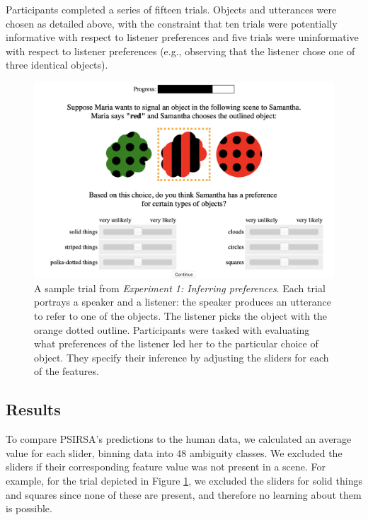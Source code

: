 \documentclass[10pt,a4paper]{article}
\newcommand{\gcs}[1]{\textcolor{blue}{[gcs: #1]}}
\begin{document}
Participants completed a series of fifteen trials. Objects and utterances were chosen as detailed above, with the constraint that ten trials were potentially informative with respect to listener preferences and five trials were uninformative with respect to listener preferences (e.g., observing that the listener chose one of three identical objects). 

\begin{figure}[ht!]
	\centering
	\includegraphics[width=4.5in]{images/preference-trial.png}
	\caption{ \small{A sample trial from \emph{Experiment 1: Inferring preferences}. Each trial portrays a speaker and a listener: the speaker produces an utterance to refer to one of the objects. The listener picks the object with the orange dotted outline. Participants were tasked with evaluating what preferences of the listener led her to the particular choice of object. They specify their inference by adjusting the sliders for each of the features}.}\label{exp1-trial}
\end{figure}

\subsection{Results}

To compare PSIRSA's predictions to the human data, we calculated an average value for each slider, binning data into 48 ambiguity classes. We excluded the sliders if their corresponding feature value was not present in a scene. For example, for the trial depicted in Figure \ref{exp1-trial}, we excluded the sliders for solid things and squares since none of these are present, and therefore no learning about them is possible.
\end{document}

